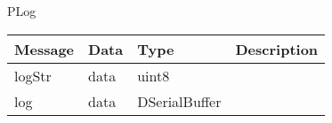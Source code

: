  {PLog}

\begin{tabular}[ht]{|l|l|l|p{8cm}|}
\hline
Message & Data & Type & Description\\
\hline
logStr &  data  &  uint8  & \\
\hline
log &  data  &  DSerialBuffer  & \\
\hline
\end{tabular}
